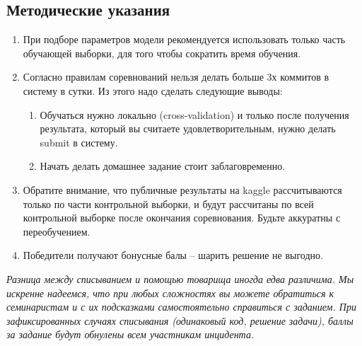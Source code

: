 \documentclass[a4paper, 12pt]{article}
\begin{document}
\subsection*{Методические указания}
  \begin{enumerate}
  \item При подборе параметров модели рекомендуется использовать только часть обучающей выборки, для того чтобы сократить время обучения. 
  \item Согласно правилам соревнований нельзя делать больше 3х коммитов в систему в сутки. Из этого надо сделать следующие выводы:
  \begin{enumerate}
      \item Обучаться нужно локально (cross-validation) и только после получения результата, который вы считаете удовлетворительным, нужно делать submit в систему.
      \item Начать делать домашнее задание стоит заблаговременно. 
  \end{enumerate}
  \item Обратите внимание, что публичные результаты на kaggle рассчитываются только по части контрольной выборки, и будут рассчитаны по всей контрольной выборке после окончания соревнования. Будьте аккуратны с переобучением.  
  \item Победители получают бонусные балы -- шарить решение не выгодно.
\end{enumerate}
\vspace{12cm}
\emph{Разница между списыванием и помощью товарища иногда едва различима. Мы искренне надеемся, что при любых сложностях вы можете обратиться к семинаристам и с их подсказками самостоятельно справиться с заданием. При зафиксированных случаях списывания (одинаковый код, решение задачи), баллы за задание будут обнулены всем участникам инцидента.}
\end{document}
